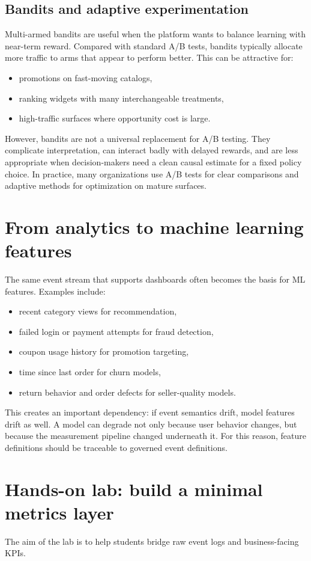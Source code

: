 \subsection{Bandits and adaptive experimentation}
Multi-armed bandits are useful when the platform wants to balance learning with near-term reward.
Compared with standard A/B tests, bandits typically allocate more traffic to arms that appear to perform better.
This can be attractive for:
\begin{itemize}
  \item promotions on fast-moving catalogs,
  \item ranking widgets with many interchangeable treatments,
  \item high-traffic surfaces where opportunity cost is large.
\end{itemize}

However, bandits are not a universal replacement for A/B testing.
They complicate interpretation, can interact badly with delayed rewards, and are less appropriate when decision-makers need a clean causal estimate for a fixed policy choice.
In practice, many organizations use A/B tests for clear comparisons and adaptive methods for optimization on mature surfaces.

\section{From analytics to machine learning features}
The same event stream that supports dashboards often becomes the basis for ML features.
Examples include:
\begin{itemize}
  \item recent category views for recommendation,
  \item failed login or payment attempts for fraud detection,
  \item coupon usage history for promotion targeting,
  \item time since last order for churn models,
  \item return behavior and order defects for seller-quality models.
\end{itemize}

This creates an important dependency: if event semantics drift, model features drift as well.
A model can degrade not only because user behavior changes, but because the measurement pipeline changed underneath it.
For this reason, feature definitions should be traceable to governed event definitions.

\section{Hands-on lab: build a minimal metrics layer}
The aim of the lab is to help students bridge raw event logs and business-facing KPIs.

